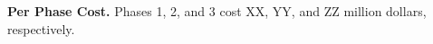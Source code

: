 
\vspace{3pt}
\noindent
\textbf{Per Phase Cost.} 
Phases 1, 2, and 3 cost XX, YY, and ZZ million dollars, respectively.

